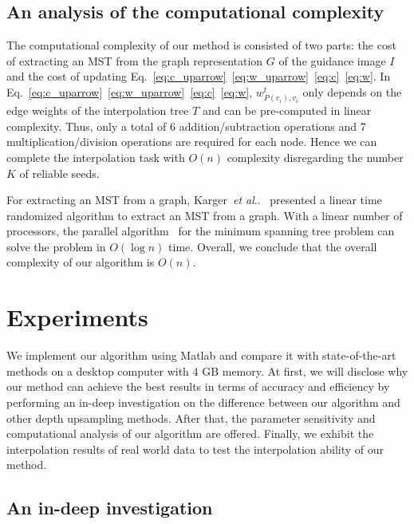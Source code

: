 \documentclass[preprint,10pt,5p,times,twocolumn]{elsarticle}
\makeatletter
\DeclareRobustCommand\onedot{\futurelet\@let@token\@onedot}
\def\@onedot{\ifx\@let@token.\else.\null\fi\xspace}
\def\etal{\emph{et al}\onedot}
\makeatother
\begin{document}
\subsection{An analysis of the computational complexity}

The computational complexity of our method is consisted of two parts: the cost of extracting an MST from the graph representation $G$ of the guidance image $I$ and the cost of updating Eq.~\eqref{eq:c_uparrow}~\eqref{eq:w_uparrow}~\eqref{eq:c}~\eqref{eq:w}. In Eq.~\eqref{eq:c_uparrow}~\eqref{eq:w_uparrow}~\eqref{eq:c}~\eqref{eq:w}, ${w^t_{P(v_i),v_i}}$ only depends on the edge weights of the interpolation tree $T$ and can be pre-computed in linear complexity. Thus, only a total of 6 addition/subtraction operations and 7 multiplication/division operations are required for each node. Hence we can complete the interpolation task with $O(n)$ complexity disregarding the number $K$ of reliable seeds.

For extracting an MST from a graph, Karger~\etal~\cite{Karger1995} presented a linear time randomized algorithm to extract an MST from a graph. With a linear number of processors, the parallel algorithm~\cite{Chong2001} for the minimum spanning tree problem can solve the problem in $O(\log n)$ time. Overall, we conclude that the overall complexity of our algorithm is $O(n)$.


\section{Experiments}
\label{sec:experiments}



We implement our algorithm using Matlab and compare it with state-of-the-art methods on a desktop computer with 4 GB memory. At first, we will disclose why our method can achieve the best results in terms of accuracy and efficiency by performing an in-deep investigation on the difference between our algorithm and other depth upsampling methods. After that, the parameter sensitivity and computational analysis of our algorithm are offered. Finally, we exhibit the interpolation results of real world data to test the interpolation ability of our method.

\subsection{An in-deep investigation}
\end{document}
